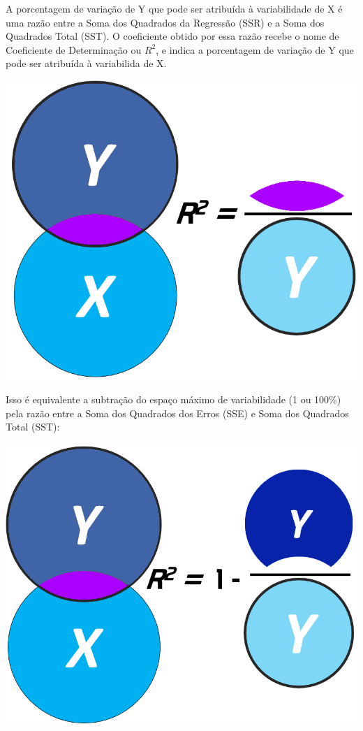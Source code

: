 \documentclass[
]{book}
\begin{document}
A porcentagem de variação de Y que pode ser atribuída à variabilidade de X é uma razão entre a Soma dos Quadrados da Regressão (SSR) e a Soma dos Quadrados Total (SST). O coeficiente obtido por essa razão recebe o nome de Coeficiente de Determinação ou \(R^2\), e indica a porcentagem de variação de Y que pode ser atribuída à variabilida de X.

\includegraphics{./img/cap_regr2.png}

Isso é equivalente a subtração do espaço máximo de variabilidade (1 ou 100\%) pela razão entre a Soma dos Quadrados dos Erros (SSE) e Soma dos Quadrados Total (SST):

\includegraphics{./img/cap_reg_r21.png}
\end{document}
